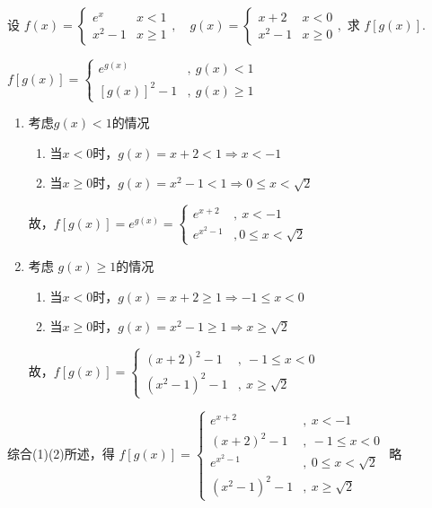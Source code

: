 \begin{Problem}
    设
    \(
    f(x)=\begin{cases}
    e^x & x<1\\
    x^2-1 & x\ge 1
    \end{cases},
    \quad
    g(x)=\begin{cases}
    x+2 & x<0\\
    x^2-1 & x\ge 0
    \end{cases},
    \)
    求 $f[g(x)]$.
\end{Problem}
\begin{Answer}
    $
    f[g(x)]=\begin{cases}
        e^{g(x)}&,\ g(x) < 1\\
        [g(x)]^{2}-1&,\ g(x) \ge 1
    \end{cases}
    $
    \begin{enumerate}[label=(\arabic*)]
        \item 考虑$
            g(x) <1
        $的情况 \begin{enumerate}[label=(\alph*)]
            \item 当$x<0$时，$g(x)=x+2 <1 \Rightarrow x < -1$
            \item 当$x\ge 0$时，$g(x)=x^2 - 1 <1\Rightarrow 0 \le x <\sqrt{2} $
        \end{enumerate}
        故，$f[g(x)]=e^{g(x)}=\begin{cases}
            e^{x+2}&,\ x < -1\\
            e^{x^2-1} &,0 \le x < \sqrt{2}
        \end{cases}$
        \item 考虑 $
            g(x) \ge 1
        $的情况 \begin{enumerate}[label=(\alph*)]
            \item 当$x < 0$时，$g(x)=x+2 \ge 1 \Rightarrow -1 \le x < 0$
            \item 当$x \ge 0$时，$g(x)=x^2 -1 \ge 1 \Rightarrow x \ge \sqrt{2}$
        \end{enumerate}
        故，$
            f[g(x)]=\begin{cases}
                (x+2)^2-1&,\ -1 \le x <0\\
                (x^2-1)^2-1 &,\ x\ge \sqrt{2}
            \end{cases}
        $
    \end{enumerate} 
    综合(1)(2)所述，得 $
        f[g(x)]=\begin{cases}
            e^{x+2}&,\ x < -1\\
            (x+2)^2-1&,\ -1 \le x < 0\\
            e^{x^2-1}&, \ 0 \le x < \sqrt{2}\\
            (x^2-1)^2-1&,\ x \ge \sqrt{2}
        \end{cases}
    $
    略
\end{Answer}
